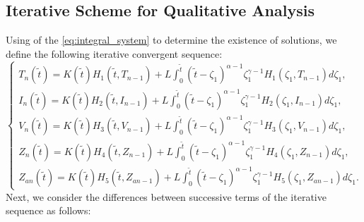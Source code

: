 \documentclass[10pt,a4paper]{amsart}
\numberwithin{equation}{section}
\begin{document}



\subsection{Iterative Scheme for Qualitative Analysis}
Using of the \eqref{eq:integral_system} to determine the existence of solutions, we define the following iterative convergent sequence:
\begin{equation}
	\begin{cases}
		T_n(\tilde{t}) = K(\tilde{t}) H_1(\tilde{t}, T_{n-1}) + L \int_0^{\tilde{t}} (\tilde{t}-\zeta_1)^{\alpha-1} \zeta_1^{\gamma-1} H_1(\zeta_1, T_{n-1}) d\zeta_1, \\[10pt]
		I_n(\tilde{t}) = K(\tilde{t}) H_2(\tilde{t}, I_{n-1}) + L \int_0^{\tilde{t}} (\tilde{t}-\zeta_1)^{\alpha-1} \zeta_1^{\gamma-1} H_2(\zeta_1, I_{n-1}) d\zeta_1, \\[10pt]
		V_n(\tilde{t}) = K(\tilde{t}) H_3(\tilde{t}, V_{n-1}) + L \int_0^{\tilde{t}} (\tilde{t}-\zeta_1)^{\alpha-1} \zeta_1^{\gamma-1} H_3(\zeta_1, V_{n-1}) d\zeta_1, \\[10pt]
		Z_n(\tilde{t}) = K(\tilde{t}) H_4(\tilde{t}, Z_{n-1}) + L \int_0^{\tilde{t}} (\tilde{t}-\zeta_1)^{\alpha-1} \zeta_1^{\gamma-1} H_4(\zeta_1, Z_{n-1}) d\zeta_1, \\[10pt]
		Z_{an}(\tilde{t}) = K(\tilde{t}) H_5(\tilde{t}, Z_{an-1}) + L \int_0^{\tilde{t}} (\tilde{t}-\zeta_1)^{\alpha-1} \zeta_1^{\gamma-1} H_5(\zeta_1, Z_{an-1}) d\zeta_1.
	\end{cases}
\end{equation}
Next, we consider the differences between successive terms of the iterative sequence as follows:
\end{document}
